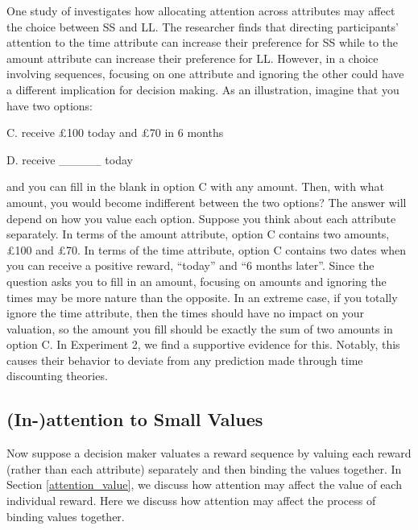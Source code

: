 \documentclass[
  12pt,
]{article}
\begin{document}
One study of \citet{fisher2021intertemporal} investigates how allocating
attention across attributes may affect the choice between SS and LL. The
researcher finds that directing participants' attention to the time
attribute can increase their preference for SS while to the amount
attribute can increase their preference for LL. However, in a choice
involving sequences, focusing on one attribute and ignoring the other
could have a different implication for decision making. As an
illustration, imagine that you have two options:

\setlength{\leftskip}{24pt}

C. receive £100 today and £70 in 6 months

D. receive \_\_\_\_\_ today

\setlength{\leftskip}{0pt}

and you can fill in the blank in option C with any amount. Then, with
what amount, you would become indifferent between the two options? The
answer will depend on how you value each option. Suppose you think about
each attribute separately. In terms of the amount attribute, option C
contains two amounts, £100 and £70. In terms of the time attribute,
option C contains two dates when you can receive a positive reward,
``today'' and ``6 months later''. Since the question asks you to fill in
an amount, focusing on amounts and ignoring the times may be more nature
than the opposite. In an extreme case, if you totally ignore the time
attribute, then the times should have no impact on your valuation, so
the amount you fill should be exactly the sum of two amounts in option
C. In Experiment 2, we find a supportive evidence for this. Notably,
this causes their behavior to deviate from any prediction made through
time discounting theories.

\hypertarget{in-attention-to-small-values}{%
\subsection{\texorpdfstring{(In-)attention to Small Values
\label{attention_small}}{(In-)attention to Small Values }}\label{in-attention-to-small-values}}

Now suppose a decision maker valuates a reward sequence by valuing each
reward (rather than each attribute) separately and then binding the
values together. In Section \ref{attention_value}, we discuss how
attention may affect the value of each individual reward. Here we
discuss how attention may affect the process of binding values together.
\end{document}

